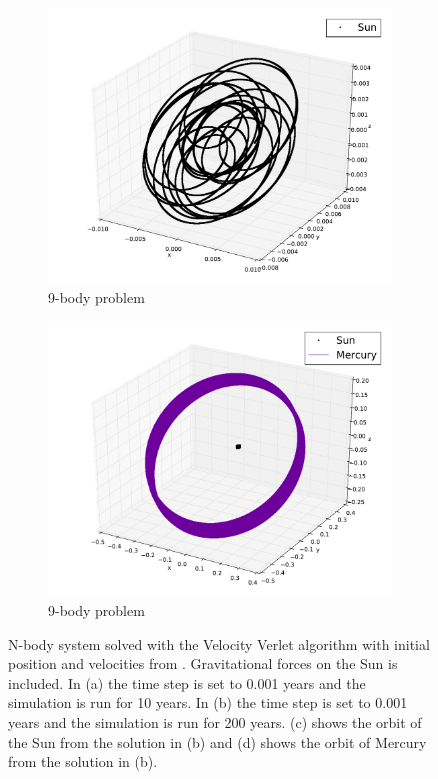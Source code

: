 \documentclass{article}
\begin{document}
\begin{figure}
\begin{subfigure}[b]{0.5\textwidth}
\centering
\includegraphics[width=1\linewidth]{fig/Solar_System_Sun.pdf}
\caption{9-body problem}
\label{subfig:9body_sun}
\end{subfigure}
\begin{subfigure}[b]{0.5\textwidth}
\centering
\includegraphics[width=1\linewidth]{fig/Solar_System_Mercury.pdf}
\caption{9-body problem}
\label{subfig:9body_mercury}
\end{subfigure}
\caption{N-body system solved with the Velocity Verlet algorithm with initial position and velocities from \cite{eph}. Gravitational forces on the Sun is included. In (a) the time step is set to 0.001 years and the simulation is run for 10 years. In (b) the time step is set to 0.001 years and the simulation is run for 200 years. (c) shows the orbit of the Sun from the solution in (b) and (d) shows the orbit of Mercury from the solution in (b).}
\label{fig:Nbody}
\end{figure}
\end{document}
